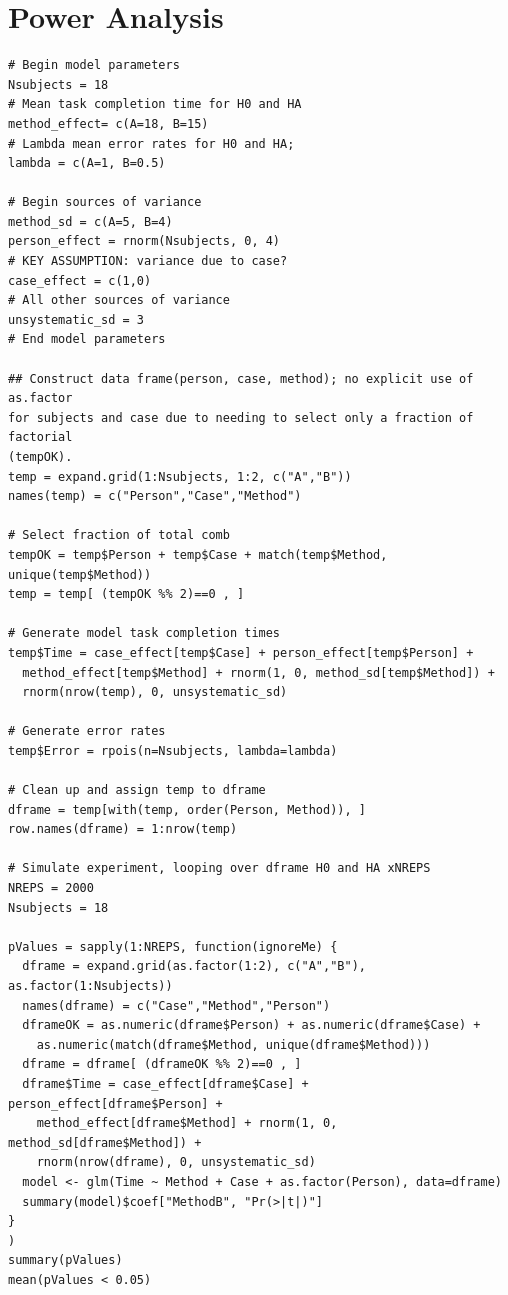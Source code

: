 \documentclass[11pt]{article}
\begin{document}
\section{Power Analysis}
\label{poweranalysis}
\begin{verbatim}
# Begin model parameters
Nsubjects = 18
# Mean task completion time for H0 and HA
method_effect= c(A=18, B=15)
# Lambda mean error rates for H0 and HA;
lambda = c(A=1, B=0.5)

# Begin sources of variance
method_sd = c(A=5, B=4)
person_effect = rnorm(Nsubjects, 0, 4)
# KEY ASSUMPTION: variance due to case?
case_effect = c(1,0)
# All other sources of variance
unsystematic_sd = 3
# End model parameters

## Construct data frame(person, case, method); no explicit use of as.factor 
for subjects and case due to needing to select only a fraction of factorial
(tempOK).
temp = expand.grid(1:Nsubjects, 1:2, c("A","B"))
names(temp) = c("Person","Case","Method")

# Select fraction of total comb
tempOK = temp$Person + temp$Case + match(temp$Method, unique(temp$Method))
temp = temp[ (tempOK %% 2)==0 , ]

# Generate model task completion times
temp$Time = case_effect[temp$Case] + person_effect[temp$Person] + 
  method_effect[temp$Method] + rnorm(1, 0, method_sd[temp$Method]) +
  rnorm(nrow(temp), 0, unsystematic_sd)

# Generate error rates
temp$Error = rpois(n=Nsubjects, lambda=lambda)

# Clean up and assign temp to dframe
dframe = temp[with(temp, order(Person, Method)), ]
row.names(dframe) = 1:nrow(temp)

# Simulate experiment, looping over dframe H0 and HA xNREPS
NREPS = 2000
Nsubjects = 18

pValues = sapply(1:NREPS, function(ignoreMe) {
  dframe = expand.grid(as.factor(1:2), c("A","B"), as.factor(1:Nsubjects))
  names(dframe) = c("Case","Method","Person")
  dframeOK = as.numeric(dframe$Person) + as.numeric(dframe$Case) + 
    as.numeric(match(dframe$Method, unique(dframe$Method)))
  dframe = dframe[ (dframeOK %% 2)==0 , ]
  dframe$Time = case_effect[dframe$Case] + person_effect[dframe$Person] + 
    method_effect[dframe$Method] + rnorm(1, 0, method_sd[dframe$Method]) + 
    rnorm(nrow(dframe), 0, unsystematic_sd)
  model <- glm(Time ~ Method + Case + as.factor(Person), data=dframe)
  summary(model)$coef["MethodB", "Pr(>|t|)"]
}
)
summary(pValues)
mean(pValues < 0.05)
\end{verbatim}
\end{document}

